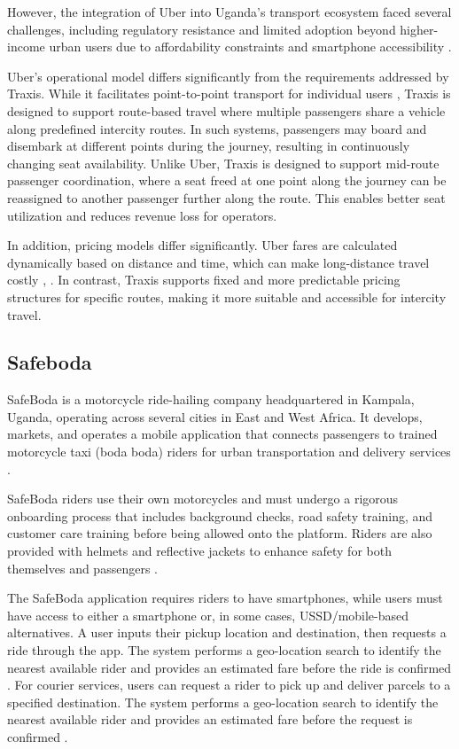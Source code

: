 However, the integration of Uber into Uganda’s transport ecosystem faced several
challenges, including regulatory resistance and limited adoption beyond higher-
income urban users due to affordability constraints and smartphone accessibility
\cite{Kayi2019} \cite{IsaacXXXX}.


Uber’s operational model differs significantly from the requirements addressed
by Traxis. While it facilitates point-to-point transport for individual users
\cite{Kayi2019}, Traxis is designed to support route-based travel where multiple
passengers share a vehicle along predefined intercity routes. In such systems,
passengers may board and disembark at different points during the journey,
resulting in continuously changing seat availability. Unlike Uber, Traxis is
designed to support mid-route passenger coordination, where a seat freed at one
point along the journey can be reassigned to another passenger further along the
route. This enables better seat utilization and reduces revenue loss for
operators.


In addition, pricing models differ significantly. Uber fares are calculated
dynamically based on distance and time, which can make long-distance travel
costly  \cite{Kayi2019} \cite{IsaacXXXX}, \cite{Monitor2016UberKampala}. In
contrast, Traxis supports fixed and more predictable pricing structures for
specific routes, making it more suitable and accessible for intercity travel.


\subsection{Safeboda}
SafeBoda is a motorcycle ride-hailing company headquartered in Kampala, Uganda,
operating across several cities in East and West Africa. It develops, markets,
and operates a mobile application that connects passengers to trained motorcycle
taxi (boda boda) riders for urban transportation and delivery services
\cite{musinguzi2022safeboda}.


SafeBoda riders use their own motorcycles and must undergo a rigorous onboarding
process that includes background checks, road safety training, and customer care
training before being allowed onto the platform. Riders are also provided with
helmets and reflective jackets to enhance safety for both themselves and
passengers \cite{muhindo2025rideculture}.


The SafeBoda application requires riders to have smartphones, while users must
have access to either a smartphone or, in some cases, USSD/mobile-based
alternatives. A user inputs their pickup location and destination, then requests
a ride through the app. The system performs a geo-location search to identify
the nearest available rider and provides an estimated fare before the ride is
confirmed . For courier services, users can request a rider to pick up and
deliver parcels to a specified destination. The system performs a geo-location
search to identify the nearest available rider and provides an estimated fare
before the request is confirmed \cite{safeboda2026faqs}.


